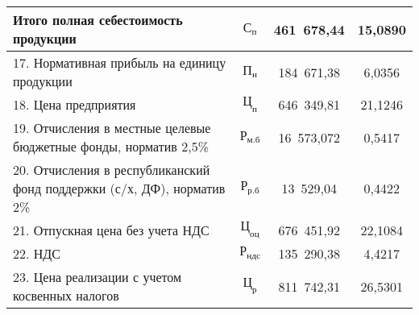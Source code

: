 {\begin{longtable}{| m{10.3cm} | c | c | c |}
      \textbf{Итого \newline полная себестоимость продукции}
      & \( \mathbf{\text{С}_{\text{п}}} \) & \textbf{461~678,44} & \textbf{15,0890} \\
      \hline

      17. Нормативная прибыль на единицу продукции
      & \( \text{П}_{\text{н}} \) & 184~671,38 & 6,0356 \\
      \hline

      18. Цена предприятия
      & \( \mathbf{\text{Ц}_{\text{п}}} \) & 646~349,81 & 21,1246 \\
      \hline

      19. Отчисления в местные целевые бюджетные фонды, \newline
      норматив 2{,}5\%
      & \( \text{Р}_{\text{м.б}} \) & 16~573,072 & 0,5417 \\
      \hline

      20. Отчисления в республиканский фонд поддержки \newline
      (с/х, ДФ), норматив 2\%
      & \( \text{Р}_{\text{р.б}} \) & 13~529,04 & 0,4422 \\
      \hline

      21. Отпускная цена без учета НДС
      & \( \text{Ц}_{\text{оц}} \) & 676~451,92 & 22,1084 \\
      \hline

      22. НДС
      & \( \text{Р}_{\text{ндс}} \) & 135~290,38 & 4,4217 \\
      \hline

      23. Цена реализации с учетом косвенных налогов
      & \( \text{Ц}_{\text{р}} \) & 811~742,31 & 26,5301 \\
      \hline
\end{longtable}
}
